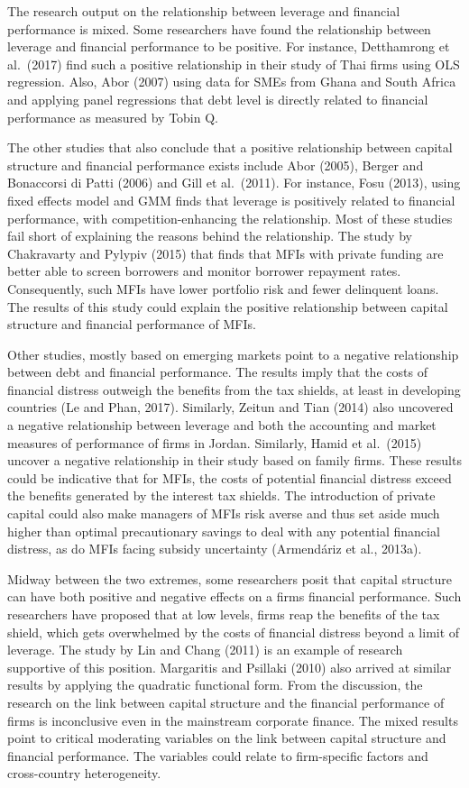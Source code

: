 \documentclass[a4paper, nobind]{templates/ociamthesis}
\begin{document}
The research output on the relationship between leverage and financial performance is mixed. Some researchers have found the relationship between leverage and financial performance to be positive. For instance, Detthamrong et al.~(2017) find such a positive relationship in their study of Thai firms using OLS regression. Also, Abor (2007) using data for SMEs from Ghana and South Africa and applying panel regressions that debt level is directly related to financial performance as measured by Tobin Q.

The other studies that also conclude that a positive relationship between capital structure and financial performance exists include Abor (2005), Berger and Bonaccorsi di Patti (2006) and Gill et al.~(2011). For instance, Fosu (2013), using fixed effects model and GMM finds that leverage is positively related to financial performance, with competition-enhancing the relationship. Most of these studies fail short of explaining the reasons behind the relationship. The study by Chakravarty and Pylypiv (2015) that finds that MFIs with private funding are better able to screen borrowers and monitor borrower repayment rates. Consequently, such MFIs have lower portfolio risk and fewer delinquent loans. The results of this study could explain the positive relationship between capital structure and financial performance of MFIs.

Other studies, mostly based on emerging markets point to a negative relationship between debt and financial performance. The results imply that the costs of financial distress outweigh the benefits from the tax shields, at least in developing countries (Le and Phan, 2017). Similarly, Zeitun and Tian (2014) also uncovered a negative relationship between leverage and both the accounting and market measures of performance of firms in Jordan. Similarly, Hamid et al.~(2015) uncover a negative relationship in their study based on family firms. These results could be indicative that for MFIs, the costs of potential financial distress exceed the benefits generated by the interest tax shields. The introduction of private capital could also make managers of MFIs risk averse and thus set aside much higher than optimal precautionary savings to deal with any potential financial distress, as do MFIs facing subsidy uncertainty (Armendáriz et al., 2013a).

Midway between the two extremes, some researchers posit that capital structure can have both positive and negative effects on a firms financial performance. Such researchers have proposed that at low levels, firms reap the benefits of the tax shield, which gets overwhelmed by the costs of financial distress beyond a limit of leverage. The study by Lin and Chang (2011) is an example of research supportive of this position. Margaritis and Psillaki (2010) also arrived at similar results by applying the quadratic functional form. From the discussion, the research on the link between capital structure and the financial performance of firms is inconclusive even in the mainstream corporate finance. The mixed results point to critical moderating variables on the link between capital structure and financial performance. The variables could relate to firm-specific factors and cross-country heterogeneity.
\end{document}
